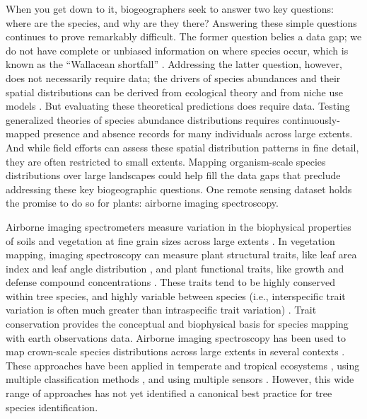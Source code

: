 When you get down to it, biogeographers seek to answer two key questions: where are the species, and why are they there? Answering these simple questions continues to prove remarkably difficult. The former question belies a data gap; we do not have complete or unbiased information on where species occur, which is known as the “Wallacean shortfall” \cite{Whittaker2005-fp, Bini2006-an}. Addressing the latter question, however, does not necessarily require data; the drivers of species abundances and their spatial distributions can be derived from ecological theory and from niche use models \cite{McGill2010-sp}. But evaluating these theoretical predictions does require data. Testing generalized theories of species abundance distributions requires continuously-mapped presence and absence records for many individuals across large extents. And while field efforts can assess these spatial distribution patterns in fine detail, they are often restricted to small extents. Mapping organism-scale species distributions over large landscapes could help fill the data gaps that preclude addressing these key biogeographic questions. One remote sensing dataset holds the promise to do so for plants: airborne imaging spectroscopy.

Airborne imaging spectrometers measure variation in the biophysical properties of soils and vegetation at fine grain sizes across large extents \cite{Goetz1985-gj}. In vegetation mapping, imaging spectroscopy can measure plant structural traits, like leaf area index and leaf angle distribution \cite{Broge2001-tv, Asner2008-bv}, and plant functional traits, like growth and defense compound concentrations \cite{Kokaly2009-xk, Cavender-Bares2016-il}. These traits tend to be highly conserved within tree species, and highly variable between species (i.e., interspecific trait variation is often much greater than intraspecific trait variation) \cite{Wright2004-md, Townsend2007-zm, Funk2017-io}. Trait conservation provides the conceptual and biophysical basis for species mapping with earth observations data. Airborne imaging spectroscopy has been used to map crown-scale species distributions across large extents in several contexts \cite{Fassnacht2016-qb}. These approaches have been applied in temperate \cite{Baldeck2014-wg} and tropical ecosystems \cite{Hesketh2012-ir}, using multiple classification methods \cite{Feret2013-ho}, and using multiple sensors \cite{Clark2005-kr, Colgan2012-hi, Baldeck2015-jd}. However, this wide range of approaches has not yet identified a canonical best practice for tree species identification.

